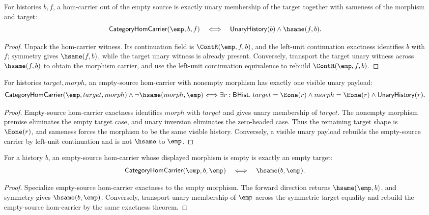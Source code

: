 \begin{theorem}
\label{thm:category-hom-carrier-empty-source-iff}
For histories \(b,f\), a hom-carrier out of the empty source is exactly unary
membership of the target together with sameness of the morphism and target:
$$
\mathsf{CategoryHomCarrier}(\emp,b,f)
\quad\Longleftrightarrow\quad
\mathsf{UnaryHistory}(b)\wedge\hsame(f,b).
$$
\end{theorem}
\begin{proof}
Unpack the hom-carrier witness. Its continuation field is
\(\ContR(\emp,f,b)\), and the left-unit continuation exactness identifies
\(b\) with \(f\); symmetry gives \(\hsame(f,b)\), while the target unary
witness is already present. Conversely, transport the target unary witness
across \(\hsame(f,b)\) to obtain the morphism carrier, and use the left-unit
continuation equivalence to rebuild \(\ContR(\emp,f,b)\).
\end{proof}

\begin{theorem}
\label{thm:category-empty-source-nonempty-morphism-shape}
For histories $target,morph$, an empty-source hom-carrier with nonempty
morphism has exactly one visible unary payload:
$$
\mathsf{CategoryHomCarrier}(\emp,target,morph)\wedge
\neg\hsame(morph,\emp)
\Longleftrightarrow
\exists r:\mathsf{BHist}.\;
target=\Eone(r)\wedge morph=\Eone(r)\wedge\mathsf{UnaryHistory}(r).
$$
\end{theorem}
\begin{proof}
Empty-source hom-carrier exactness identifies $morph$ with $target$ and gives
unary membership of $target$. The nonempty morphism premise eliminates the
empty target case, and unary inversion eliminates the zero-headed case. Thus
the remaining target shape is $\Eone(r)$, and sameness forces the morphism to
be the same visible history. Conversely, a visible unary payload rebuilds the
empty-source carrier by left-unit continuation and is not $\hsame$ to $\emp$.
\end{proof}

\begin{theorem}
\label{thm:category-hom-carrier-empty-source-empty-morphism-iff}
For a history $b$, an empty-source hom-carrier whose displayed morphism is
empty is exactly an empty target:
$$
\mathsf{CategoryHomCarrier}(\emp,b,\emp)
\quad\Longleftrightarrow\quad
\hsame(b,\emp).
$$
\end{theorem}
\begin{proof}
Specialize empty-source hom-carrier exactness to the empty morphism. The
forward direction returns $\hsame(\emp,b)$, and symmetry gives
$\hsame(b,\emp)$. Conversely, transport unary membership of $\emp$ across
the symmetric target equality and rebuild the empty-source hom-carrier by the
same exactness theorem.
\end{proof}


